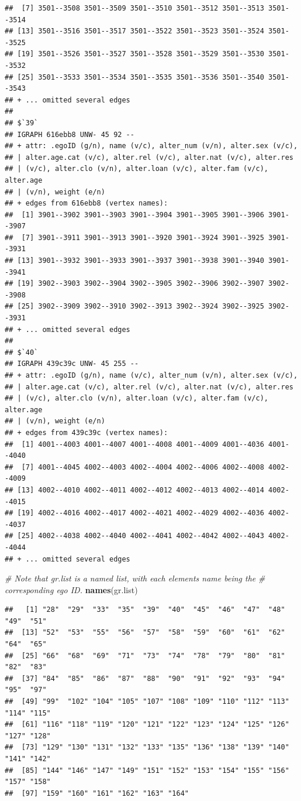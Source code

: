 \documentclass[
]{book}
\newenvironment{Shaded}{\begin{snugshade}}{\end{snugshade}}
\newcommand{\CommentTok}[1]{\textcolor[rgb]{0.56,0.35,0.01}{\textit{#1}}}
\newcommand{\FunctionTok}[1]{\textcolor[rgb]{0.13,0.29,0.53}{\textbf{#1}}}
\newcommand{\NormalTok}[1]{#1}
\begin{document}
\begin{verbatim}
##  [7] 3501--3508 3501--3509 3501--3510 3501--3512 3501--3513 3501--3514
## [13] 3501--3516 3501--3517 3501--3522 3501--3523 3501--3524 3501--3525
## [19] 3501--3526 3501--3527 3501--3528 3501--3529 3501--3530 3501--3532
## [25] 3501--3533 3501--3534 3501--3535 3501--3536 3501--3540 3501--3543
## + ... omitted several edges
## 
## $`39`
## IGRAPH 616ebb8 UNW- 45 92 -- 
## + attr: .egoID (g/n), name (v/c), alter_num (v/n), alter.sex (v/c),
## | alter.age.cat (v/c), alter.rel (v/c), alter.nat (v/c), alter.res
## | (v/c), alter.clo (v/n), alter.loan (v/c), alter.fam (v/c), alter.age
## | (v/n), weight (e/n)
## + edges from 616ebb8 (vertex names):
##  [1] 3901--3902 3901--3903 3901--3904 3901--3905 3901--3906 3901--3907
##  [7] 3901--3911 3901--3913 3901--3920 3901--3924 3901--3925 3901--3931
## [13] 3901--3932 3901--3933 3901--3937 3901--3938 3901--3940 3901--3941
## [19] 3902--3903 3902--3904 3902--3905 3902--3906 3902--3907 3902--3908
## [25] 3902--3909 3902--3910 3902--3913 3902--3924 3902--3925 3902--3931
## + ... omitted several edges
## 
## $`40`
## IGRAPH 439c39c UNW- 45 255 -- 
## + attr: .egoID (g/n), name (v/c), alter_num (v/n), alter.sex (v/c),
## | alter.age.cat (v/c), alter.rel (v/c), alter.nat (v/c), alter.res
## | (v/c), alter.clo (v/n), alter.loan (v/c), alter.fam (v/c), alter.age
## | (v/n), weight (e/n)
## + edges from 439c39c (vertex names):
##  [1] 4001--4003 4001--4007 4001--4008 4001--4009 4001--4036 4001--4040
##  [7] 4001--4045 4002--4003 4002--4004 4002--4006 4002--4008 4002--4009
## [13] 4002--4010 4002--4011 4002--4012 4002--4013 4002--4014 4002--4015
## [19] 4002--4016 4002--4017 4002--4021 4002--4029 4002--4036 4002--4037
## [25] 4002--4038 4002--4040 4002--4041 4002--4042 4002--4043 4002--4044
## + ... omitted several edges
\end{verbatim}

\begin{Shaded}
\begin{Highlighting}[]
\CommentTok{\# Note that gr.list is a named list, with each element\textquotesingle{}s name being the }
\CommentTok{\# corresponding ego ID.}
\FunctionTok{names}\NormalTok{(gr.list)}
\end{Highlighting}
\end{Shaded}

\begin{verbatim}
##   [1] "28"  "29"  "33"  "35"  "39"  "40"  "45"  "46"  "47"  "48"  "49"  "51" 
##  [13] "52"  "53"  "55"  "56"  "57"  "58"  "59"  "60"  "61"  "62"  "64"  "65" 
##  [25] "66"  "68"  "69"  "71"  "73"  "74"  "78"  "79"  "80"  "81"  "82"  "83" 
##  [37] "84"  "85"  "86"  "87"  "88"  "90"  "91"  "92"  "93"  "94"  "95"  "97" 
##  [49] "99"  "102" "104" "105" "107" "108" "109" "110" "112" "113" "114" "115"
##  [61] "116" "118" "119" "120" "121" "122" "123" "124" "125" "126" "127" "128"
##  [73] "129" "130" "131" "132" "133" "135" "136" "138" "139" "140" "141" "142"
##  [85] "144" "146" "147" "149" "151" "152" "153" "154" "155" "156" "157" "158"
##  [97] "159" "160" "161" "162" "163" "164"
\end{verbatim}
\end{document}
